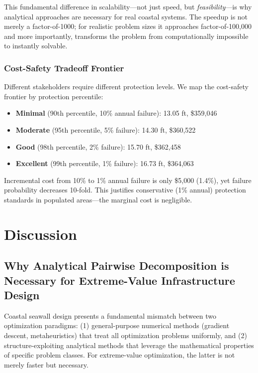 \documentclass[review]{elsarticle}
\begin{document}
This fundamental difference in scalability—not just speed, but \textit{feasibility}—is why analytical approaches are necessary for real coastal systems. The speedup is not merely a factor-of-1000; for realistic problem sizes it approaches factor-of-100,000 and more importantly, transforms the problem from computationally impossible to instantly solvable.

\subsubsection{Cost-Safety Tradeoff Frontier}

Different stakeholders require different protection levels. We map the cost-safety frontier by protection percentile:

\begin{itemize}
\item \textbf{Minimal} (90th percentile, 10\% annual failure): 13.05 ft, \$359,046
\item \textbf{Moderate} (95th percentile, 5\% failure): 14.30 ft, \$360,522
\item \textbf{Good} (98th percentile, 2\% failure): 15.70 ft, \$362,458
\item \textbf{Excellent} (99th percentile, 1\% failure): 16.73 ft, \$364,063
\end{itemize}

Incremental cost from 10\% to 1\% annual failure is only \$5,000 (1.4\%), yet failure probability decreases 10-fold. This justifies conservative (1\% annual) protection standards in populated areas—the marginal cost is negligible.

\section{Discussion}

\subsection{Why Analytical Pairwise Decomposition is Necessary for Extreme-Value Infrastructure Design}

Coastal seawall design presents a fundamental mismatch between two optimization paradigms: (1) general-purpose numerical methods (gradient descent, metaheuristics) that treat all optimization problems uniformly, and (2) structure-exploiting analytical methods that leverage the mathematical properties of specific problem classes. For extreme-value optimization, the latter is not merely faster but necessary.
\end{document}

